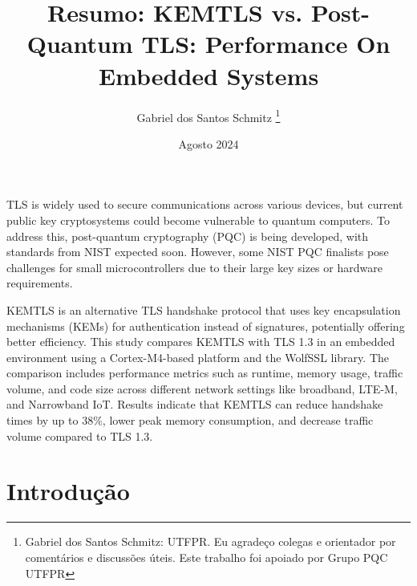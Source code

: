 \documentclass[letterpaper,11pt,leqno]{article}
\begin{document}
\title{Resumo: KEMTLS vs. Post-Quantum TLS: Performance On Embedded Systems}

\author{Gabriel dos Santos Schmitz
	\thanks{Gabriel dos Santos Schmitz: UTFPR. Eu agradeço colegas e orientador
		por comentários e discussões úteis. Este trabalho foi apoiado por Grupo PQC
		UTFPR}}

\date{Agosto 2024}


\begin{titlepage}

	\maketitle

	TLS is widely used to secure communications across various devices, but
	current public key cryptosystems could become vulnerable to quantum computers.
	To address this, post-quantum cryptography (PQC) is being developed, with
	standards from NIST expected soon. However, some NIST PQC finalists pose
	challenges for small microcontrollers due to their large key sizes or hardware
	requirements.

	KEMTLS is an alternative TLS handshake protocol that uses key encapsulation
	mechanisms (KEMs) for authentication instead of signatures, potentially
	offering better efficiency. This study compares KEMTLS with TLS 1.3 in an
	embedded environment using a Cortex-M4-based platform and the WolfSSL library.
	The comparison includes performance metrics such as runtime, memory usage,
	traffic volume, and code size across different network settings like
	broadband, LTE-M, and Narrowband IoT. Results indicate that KEMTLS can reduce
	handshake times by up to 38\%, lower peak memory consumption, and decrease
	traffic volume compared to TLS 1.3.

\end{titlepage}

\section{Introdução}
\end{document}
